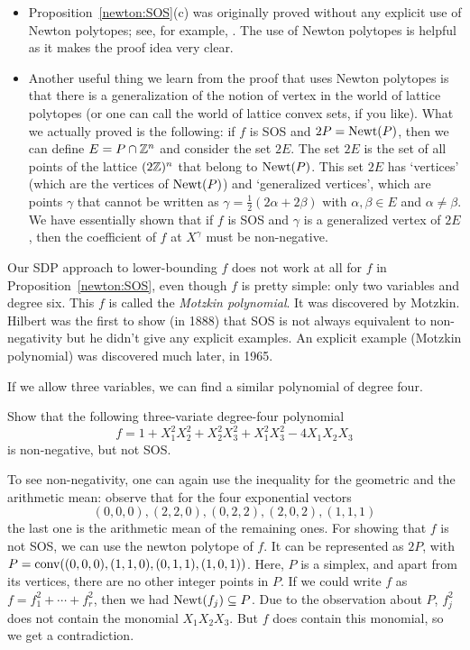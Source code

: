 \begin{itemize}
	\item Proposition~\ref{newton:SOS}(c) was originally proved without any explicit use of Newton polytopes; see, for example, \cite{Marshall:2008}. The use of Newton polytopes is helpful as it makes the proof idea very clear.
	\item Another useful thing we learn from the proof that uses Newton polytopes is that there is a generalization of the notion of vertex in the world of lattice polytopes (or one can call the world of lattice convex sets, if you like). What we actually proved is the following: if $f$ is SOS and $2P = \operatorname{Newt}(P)$, then we can define $E = P \cap \mathbb{Z}^n$ and consider the set $2 E$. The set $2E$ is the set of all points of the lattice $(2\mathbb{Z})^n$ that belong to $\operatorname{Newt}(P)$. This set $2 E$ has `vertices' (which are the vertices of $\operatorname{Newt}(P)$) and `generalized vertices', which are points $\gamma$ that cannot be written as $\gamma = \frac{1}{2} (2 \alpha + 2 \beta)$ with $\alpha, \beta \in E$ and $\alpha \ne \beta$. We have essentially shown that if $f$ is SOS and $\gamma$ is a generalized vertex of $2 E$, then the coefficient of $f$ at $X^\gamma$ must be non-negative.
\end{itemize}


Our SDP approach to lower-bounding $f$ does not work at all for $f$ in Proposition~\ref{newton:SOS}, even though $f$ is pretty simple: only two variables and degree six. This $f$ is called the \emph{Motzkin polynomial}. It was discovered by Motzkin. Hilbert was the first to show (in 1888) that SOS is not always equivalent to non-negativity but he didn't give any explicit examples. An explicit example (Motzkin polynomial) was discovered much later, in 1965.

If we allow three variables, we can find a similar polynomial of degree four.

\begin{exercise}
	\label{choi:lam:exer}	
	Show that the following three-variate degree-four polynomial 
	\[
		f = 1 + X_1^2 X_2^2 + X_2^2 X_3^2 + X_1^2 X_3^2 - 4 X_1 X_2 X_3
	\]
	is non-negative, but not SOS. 
\end{exercise} 
\begin{solution}
	To see non-negativity, one can again use the inequality for the geometric and the arithmetic mean: observe that for the four exponential vectors 
	\[
		(0,0,0), (2,2,0),(0,2,2), (2,0,2), (1,1,1)
	\]
	the last one is the arithmetic mean of the remaining ones. 
	For showing that $f$ is not SOS, we can use the newton polytope of $f$. It can be represented as $2 P$, with $P = \operatorname{conv}( (0,0,0), (1,1,0), (0,1,1), (1,0,1) )$. Here, $P$ is a simplex, and apart from its vertices, there are no other integer points in $P$. If we could write $f$ as $f= f_1^2 + \cdots + f_r^2$, then we had $\operatorname{Newt}(f_j) \subseteq P$. Due to the observation about $P$,  $f_j^2$ does not contain the monomial  $X_1 X_2 X_3$. But $f$ does contain this monomial, so we get a contradiction. 
\end{solution}


